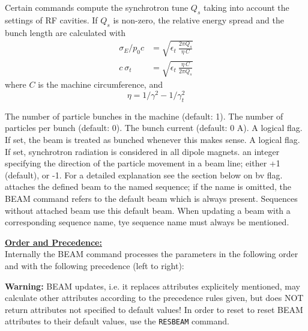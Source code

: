 Certain commands compute the synchrotron tune $Q_s$ taking into account
the settings of RF cavities. 
If $Q_s$ is non-zero, the relative energy spread and 
the bunch length are calculated with
\begin{align}
    \sigma_E / p_0 c  &=  \sqrt{\epsilon_t\ \frac{2 \pi Q_s}{\eta\ C}} \\
          c\ \sigma_t &= \sqrt{\epsilon_t\ \frac{\eta\ C}{2 \pi Q_s}}
\end{align}
where $C$ is the machine circumference, and 
\begin{equation}
  \eta = 1/\gamma^2 - 1/\gamma_t^2  
\end{equation}

\begin{madlist}
   The number of particle bunches in the
  machine (default: 1).  
   \label{beam_npart} The number of particles per bunch (default: 0). 
   The bunch current (default: 0 A). 
   A logical flag. If set, the beam is
  treated as bunched whenever this makes sense.  
   \label{beam_radiate} A logical flag. If set, synchrotron
  radiation is considered in all dipole magnets.  
   an integer specifying the direction of the
  particle movement in a beam line; either +1 (default), or -1. For a
  detailed explanation see the section below on bv flag.  
   attaches the defined beam to the named sequence; if
  the name is omitted, the BEAM command refers to the default beam
  which is always present. Sequences without attached beam use this
  default beam. When updating a beam with a corresponding sequence name,
  tye sequence name must always be mentioned.    
\end{madlist} 

{\bf \underline{Order and Precedence:}}\\
Internally the BEAM command processes the parameters in the following
order and with the following precedence (left to right): 


{\bf Warning:} BEAM updates, i.e. it replaces attributes explicitely
mentioned, may calculate other attributes according to the precedence rules
given, but does NOT return attributes not specified to default values! 
In order to reset to reset BEAM attributes to their default values, use
the {\tt RESBEAM} command.


